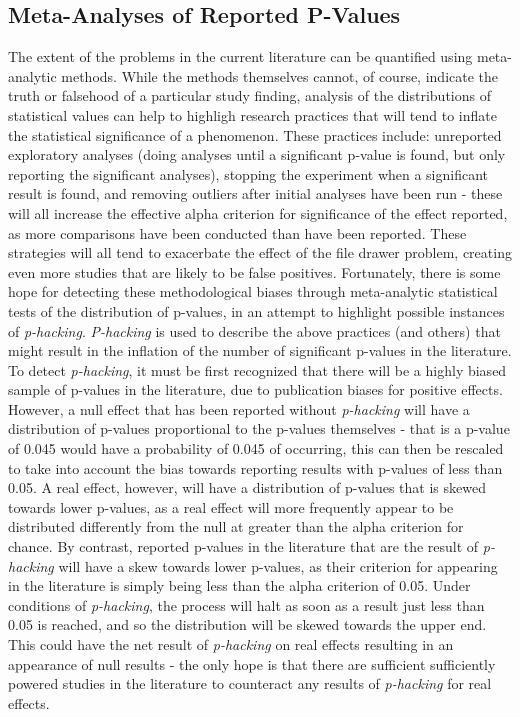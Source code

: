 \documentclass[12pt,a4paper,titlepage]{scrreprt}
\begin{document}
\subsection{Meta-Analyses of Reported P-Values}
The extent of the problems in the current literature can be quantified using meta-analytic methods. While the methods themselves cannot, of course, indicate the truth or falsehood of a particular study finding, analysis of the distributions of statistical values can help to highligh research practices that will tend to inflate the statistical significance of a phenomenon\cite{john_measuring_2012}. These practices include: unreported exploratory analyses (doing analyses until a significant p-value is found, but only reporting the significant analyses), stopping the experiment when a significant result is found, and removing outliers after initial analyses have been run - these will all increase the effective alpha criterion for significance of the effect reported, as more comparisons have been conducted than have been reported. These strategies will all tend to exacerbate the effect of the file drawer problem, creating even more studies that are likely to be false positives\cite{bakker_rules_2012}.
Fortunately, there is some hope for detecting these methodological biases through meta-analytic statistical tests of the distribution of p-values, in an attempt to highlight possible instances of \textit{p-hacking}\cite{simonsohn_p-curve:_2013}. \textit{P-hacking} is used to describe the above practices (and others) that might result in the inflation of the number of significant p-values in the literature.
To detect \textit{p-hacking}, it must be first recognized that there will be a highly biased sample of p-values in the literature, due to publication biases for positive effects. However, a null effect that has been reported without \textit{p-hacking} will have a distribution of p-values proportional to the p-values themselves - that is a p-value of 0.045 would have a probability of 0.045 of occurring, this can then be rescaled to take into account the bias towards reporting results with p-values of less than 0.05. A real effect, however, will have a distribution of p-values that is skewed towards lower p-values, as a real effect will more frequently appear to be distributed differently from the null at greater than the alpha criterion for chance.
By contrast, reported p-values in the literature that are the result of \textit{p-hacking} will have a skew towards lower p-values, as their criterion for appearing in the literature is simply being less than the alpha criterion of 0.05. Under conditions of \textit{p-hacking}, the process will halt as soon as a result just less than 0.05 is reached, and so the distribution will be skewed towards the upper end. This could have the net result of \textit{p-hacking} on real effects resulting in an appearance of null results - the only hope is that there are sufficient sufficiently powered studies in the literature to counteract any results of \textit{p-hacking} for real effects.
\end{document}

